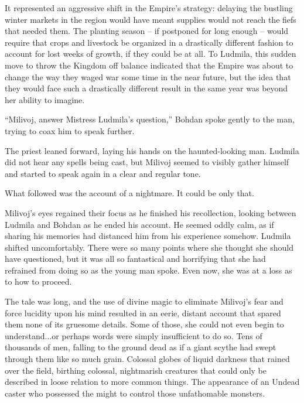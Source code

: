 It represented an aggressive shift in the Empire’s strategy: delaying the bustling winter markets in the region would have meant supplies would not reach the fiefs that needed them. The planting season – if postponed for long enough – would require that crops and livestock be organized in a drastically different fashion to account for lost weeks of growth, if they could be at all. To Ludmila, this sudden move to throw the Kingdom off balance indicated that the Empire was about to change the way they waged war some time in the near future, but the idea that they would face such a drastically different result in the same year was beyond her ability to imagine.

 

“Milivoj, answer Mistress Ludmila’s question,” Bohdan spoke gently to the man, trying to coax him to speak further.

 

The priest leaned forward, laying his hands on the haunted-looking man. Ludmila did not hear any spells being cast, but Milivoj seemed to visibly gather himself and started to speak again in a clear and regular tone.

 

What followed was the account of a nightmare. It could be only that.

 

Milivoj’s eyes regained their focus as he finished his recollection, looking between Ludmila and Bohdan as he ended his account. He seemed oddly calm, as if sharing his memories had distanced him from his experience somehow. Ludmila shifted uncomfortably. There were so many points where she thought she should have questioned, but it was all so fantastical and horrifying that she had refrained from doing so as the young man spoke. Even now, she was at a loss as to how to proceed.

 

The tale was long, and the use of divine magic to eliminate Milivoj’s fear and force lucidity upon his mind resulted in an eerie, distant account that spared them none of its gruesome details. Some of those, she could not even begin to understand...or perhaps words were simply insufficient to do so. Tens of thousands of men, falling to the ground dead as if a giant scythe had swept through them like so much grain. Colossal globes of liquid darkness that rained over the field, birthing colossal, nightmarish creatures that could only be described in loose relation to more common things. The appearance of an Undead caster who possessed the might to control those unfathomable monsters.

